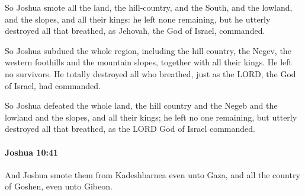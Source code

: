 			\begin{versebox}
					\item[BHS] 
					\item[ASV] So Joshua smote all the land, the hill-country, and the South, and the lowland, and the slopes, and all their kings: he left none remaining, but he utterly destroyed all that breathed, as Jehovah, the God of Israel, commanded.
					\item[NIV] So Joshua subdued the whole region, including the hill country, the Negev, the western foothills and the mountain slopes, together with all their kings. He left no survivors. He totally destroyed all who breathed, just as the LORD, the God of Israel, had commanded.
					\item[NRSV] So Joshua defeated the whole land, the hill country and the Negeb and the lowland and the slopes, and all their kings; he left no one remaining, but utterly destroyed all that breathed, as the LORD God of Israel commanded.
			\end{versebox}

		\paragraph{Joshua 10:41} %
			\label{JOSHUA-10-41}

			And Joshua smote them from Kadeshbarnea even unto Gaza, and all the country of Goshen, even unto Gibeon.

